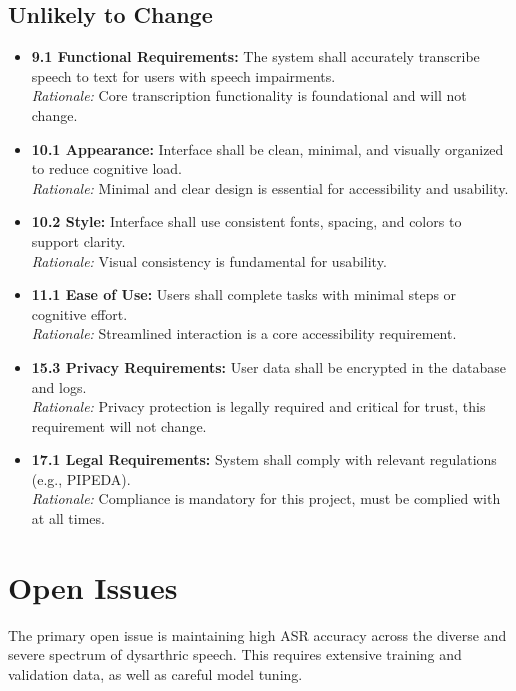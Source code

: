\documentclass[12pt]{article}
\begin{document}
\subsection{Unlikely to Change}
\begin{itemize}
    \item \textbf{9.1 Functional Requirements:} The system shall accurately transcribe speech to text for users with speech impairments.\\
    \textit{Rationale:} Core transcription functionality is foundational and will not change.

    \item \textbf{10.1 Appearance:} Interface shall be clean, minimal, and visually organized to reduce cognitive load.\\
    \textit{Rationale:} Minimal and clear design is essential for accessibility and usability.

    \item \textbf{10.2 Style:} Interface shall use consistent fonts, spacing, and colors to support clarity.\\
    \textit{Rationale:} Visual consistency is fundamental for usability.

    \item \textbf{11.1 Ease of Use:} Users shall complete tasks with minimal steps or cognitive effort.\\
    \textit{Rationale:} Streamlined interaction is a core accessibility requirement.

    \item \textbf{15.3 Privacy Requirements:} User data shall be encrypted in the database and logs. \\
    \textit{Rationale:} Privacy protection is legally required and critical for trust, this requirement will not change.

    \item \textbf{17.1 Legal Requirements:} System shall comply with relevant regulations (e.g., PIPEDA).\\
    \textit{Rationale:} Compliance is mandatory for this project, must be complied with at all times.

\end{itemize}

\section{Open Issues}
The primary open issue is maintaining high ASR accuracy across the diverse and severe spectrum of dysarthric speech. This requires extensive training and validation data, as well as careful model tuning.
\end{document}
